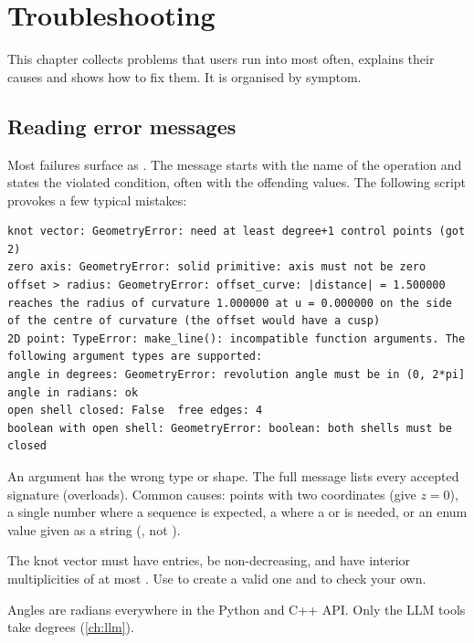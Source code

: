 \chapter{Troubleshooting}\label{ch:troubleshooting}

This chapter collects problems that users run into most often, explains their causes and shows
how to fix them. It is organised by symptom.

\section{Reading error messages}\label{sec:ts-errors}

Most failures surface as . The message starts with the name of the
operation and states the violated condition, often with the offending values. The following
script provokes a few typical mistakes:


\begin{lstlisting}[style=text]
knot vector: GeometryError: need at least degree+1 control points (got 2)
zero axis: GeometryError: solid primitive: axis must not be zero
offset > radius: GeometryError: offset_curve: |distance| = 1.500000 reaches the radius of curvature 1.000000 at u = 0.000000 on the side of the centre of curvature (the offset would have a cusp)
2D point: TypeError: make_line(): incompatible function arguments. The following argument types are supported:
angle in degrees: GeometryError: revolution angle must be in (0, 2*pi]
angle in radians: ok
open shell closed: False  free edges: 4
boolean with open shell: GeometryError: boolean: both shells must be closed
\end{lstlisting}

\begin{description}[style=nextline,leftmargin=1.5em]
  \item[\code{TypeError: ... incompatible function arguments}] An argument has the wrong type
    or shape. The full message lists every accepted signature (overloads). Common causes:
    points with two coordinates (give $z=0$), a single number where a sequence is expected,
    a  where a  or  is needed, or an enum
    value given as a string (, not ).
  \item[Errors about knot vectors] The knot vector must have 
    entries, be non-decreasing, and have interior multiplicities of at most .
    Use  to create a valid one and  to
    check your own.
  \item[\code{... must be in (0, 2*pi]}] Angles are radians everywhere in the Python and C++ API.
    Only the LLM tools take degrees (\cref{ch:llm}).
\end{description}

